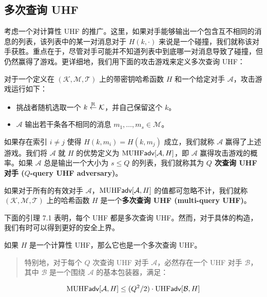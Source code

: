 \subsection{多次查询 UHF}

考虑一个对计算性 UHF 的推广。这里，如果对手能够输出一个包含互不相同的消息的列表，该列表中的某一对消息对于 $H(k,\cdot)$ 来说是一个碰撞，我们就称该对手获胜。重点在于，尽管对手可能并不知道列表中到底哪一对消息导致了碰撞，但仍然赢得了游戏。更详细地，我们用下面的攻击游戏来定义多次查询 UHF：

\begin{game}\label{game:7-2}
对于一个定义在 $(\mathcal{K},\mathcal{M},\mathcal{T})$ 上的带密钥哈希函数 $H$ 和一个给定对手 $\mathcal{A}$，攻击游戏运行如下：
\begin{itemize}
	\item 挑战者随机选取一个 $k\overset{\rm R}\leftarrow\mathcal{K}$，并自己保留这个 $k$。
	\item $\mathcal{A}$ 输出若干条各不相同的消息 $m_1,\dots,m_s\in\mathcal{M}$。
\end{itemize}
如果存在索引 $i\neq j$ 使得 $H(k,m_i)=H(k,m_j)$ 成立，我们就称 $\mathcal{A}$ 赢得了上述游戏。我们将 $\mathcal{A}$ 就 $H$ 的优势定义为 ${\rm MUHF}\mathsf{adv}[\mathcal{A},H]$，即 $\mathcal{A}$ 赢得攻击游戏的概率。如果 $\mathcal{A}$ 总是输出一个大小为 $s\leq Q$ 的列表，我们就称其为 \textbf{$Q$ 次查询 UHF 对手 ($Q$-query UHF adversary)}。
\end{game}

\begin{definition}\label{def:7-3}
如果对于所有的有效对手 $\mathcal{A}$，${\rm MUHF}\mathsf{adv}[\mathcal{A},H]$ 的值都可忽略不计，我们就称 $(\mathcal{K},\mathcal{M},\mathcal{T})$ 上的哈希函数 $H$ 是一个\textbf{多次查询 UHF (multi-query UHF)}。
\end{definition}

下面的引理 7.1 表明，每个 UHF 都是多次查询 UHF。然而，对于具体的构造，我们有时可以得到更好的安全上界。

\begin{lemma}\label{lemma:7-1}
如果 $H$ 是一个计算性 UHF，那么它也是一个多次查询 UHF。
\begin{quote}
特别地，对于每个 $Q$ 次查询 UHF 对手 $\mathcal{A}$，必然存在一个 UHF 对手 $\mathcal{B}$，其中 $\mathcal{B}$ 是一个围绕 $\mathcal{A}$ 的基本包装器，满足：
\end{quote}
\begin{equation}\label{eq:7-2}
{\rm MUHF}\mathsf{adv}[\mathcal{A},H]\leq{(Q^2/2)}\cdot{\rm UHF}\mathsf{adv}[\mathcal{B},H]
\end{equation}
\end{lemma}

